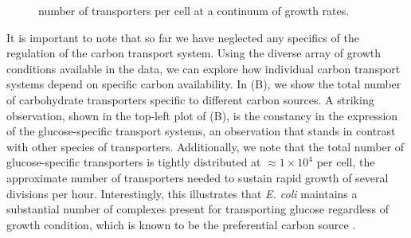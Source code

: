 \begin{figure}
\begin{fullwidth}
{    number of transporters per cell at a continuum of growth
    rates.}\label{fig:carbon_tport} \label{figsupp:phospho_sulfo}
    \end{fullwidth}
\end{figure}

It is important to note that so far we have neglected any specifics of the
regulation of the carbon transport system. Using the diverse array of growth
conditions available in the data, we can explore how individual carbon
transport systems depend on specific carbon availability. In
(B), we show the total number of carbohydrate transporters
specific to different carbon sources. A striking observation, shown in the
top-left plot of (B), is the constancy in the expression of
the glucose-specific transport systems, an observation that stands in
contrast with other species of transporters. Additionally, we note that the
total number of glucose-specific transporters is tightly distributed at
$\approx 1\times 10^4$ per cell, the approximate number of transporters
needed to sustain rapid growth of several divisions per hour. Interestingly,
this illustrates that \textit{E. coli} maintains a substantial number of
complexes present for transporting glucose regardless of growth condition,
which is known to be the preferential carbon source \citep{monod1947,
liu2005a, aidelberg2014}.

